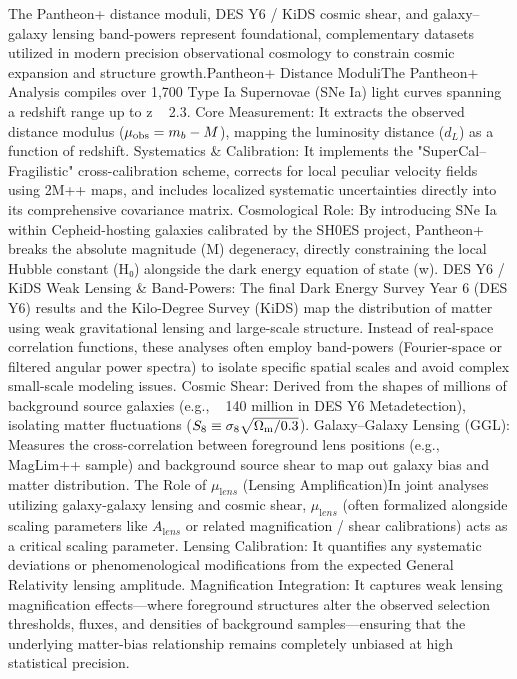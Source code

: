 The Pantheon+ distance moduli, DES Y6 / KiDS cosmic shear, and galaxy–galaxy lensing band-powers represent foundational, complementary datasets utilized in modern precision observational cosmology to constrain cosmic expansion and structure growth.Pantheon+ Distance ModuliThe Pantheon+ Analysis compiles over 1,700 Type Ia Supernovae (SNe Ia) light curves spanning a redshift range up to z ~ 2.3.
Core Measurement: It extracts the observed distance modulus (\(\mu_{\rm obs} = m_b - M\)), mapping the luminosity distance (\(d_{L}\)) as a function of redshift.
Systematics & Calibration: It implements the "SuperCal–Fragilistic" cross-calibration scheme, corrects for local peculiar velocity fields using 2M++ maps, and includes localized systematic uncertainties directly into its comprehensive covariance matrix.
Cosmological Role: By introducing SNe Ia within Cepheid-hosting galaxies calibrated by the SH0ES project, Pantheon+ breaks the absolute magnitude (M) degeneracy, directly constraining the local Hubble constant (H₀) alongside the dark energy equation of state (w).
DES Y6 / KiDS Weak Lensing & Band-Powers: The final Dark Energy Survey Year 6 (DES Y6) results and the Kilo-Degree Survey (KiDS) map the distribution of matter using weak gravitational lensing and large-scale structure. Instead of real-space correlation functions, these analyses often employ band-powers (Fourier-space or filtered angular power spectra) to isolate specific spatial scales and avoid complex small-scale modeling issues.
Cosmic Shear: Derived from the shapes of millions of background source galaxies (e.g., ~ 140 million in DES Y6 Metadetection), isolating matter fluctuations (\(S_8 \equiv \sigma_8 \sqrt{\Omega_{\rm m}/0.3}\)).
Galaxy–Galaxy Lensing (GGL): Measures the cross-correlation between foreground lens positions (e.g., MagLim++ sample) and background source shear to map out galaxy bias and matter distribution.
The Role of \(\mu _{\mathrm{l}ens}\) (Lensing Amplification)In joint analyses utilizing galaxy-galaxy lensing and cosmic shear, \(\mu _{\mathrm{l}ens}\) (often formalized alongside scaling parameters like \(A_{\mathrm{l}ens}\) or related magnification / shear calibrations) acts as a critical scaling parameter.
Lensing Calibration: It quantifies any systematic deviations or phenomenological modifications from the expected General Relativity lensing amplitude.
Magnification Integration: It captures weak lensing magnification effects—where foreground structures alter the observed selection thresholds, fluxes, and densities of background samples—ensuring that the underlying matter-bias relationship remains completely unbiased at high statistical precision.
